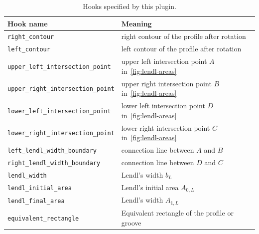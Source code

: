 \documentclass[11pt]{PyRollDocs}
\begin{document}
    \begin{table}
        \centering
        \caption{Hooks specified by this plugin.}
        \label{tab:hookspecs}
        \begin{tabular}{ll}
            \toprule
            Hook name                                  & Meaning                                                     \\
            \midrule
            \texttt{right\_contour}                    & right contour of the profile after rotation                 \\
            \texttt{left\_contour}                     & left contour of the profile after rotation                  \\
            \texttt{upper\_left\_intersection\_point}  & upper left intersection point $A$ in~\ref{fig:lendl-areas}  \\
            \texttt{upper\_right\_intersection\_point} & upper right intersection point $B$ in~\ref{fig:lendl-areas} \\
            \texttt{lower\_left\_intersection\_point}  & lower left intersection point  $D$ in~\ref{fig:lendl-areas}   \\
            \texttt{lower\_right\_intersection\_point} & lower right intersection point $C$ in~\ref{fig:lendl-areas} \\
            \texttt{left\_lendl\_width\_boundary}      & connection line between $A$ and $B$                         \\
            \texttt{right\_lendl\_width\_boundary}     & connection line between $D$ and $C$                         \\
            \texttt{lendl\_width}                      & Lendl's width $b_L$                                         \\
            \texttt{lendl\_initial\_area}              & Lendl's initial area $A_{0,L}$                              \\
            \texttt{lendl\_final\_area}                & Lendl's width $A_{1,L}$                                     \\
            \texttt{equivalent\_rectangle}             & Equivalent rectangle of the profile or groove               \\

            \bottomrule
        \end{tabular}
    \end{table}

    \printbibliography
\end{document}
